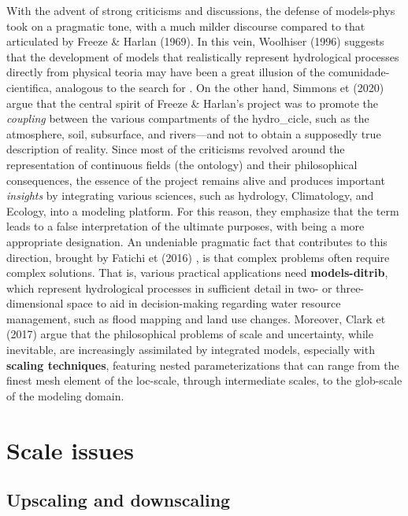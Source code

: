 \documentclass[./main_en.tex]{subfiles}
\begin{document}
\par With the advent of strong criticisms and discussions, the defense of \gls{models-phys} took on a pragmatic tone, with a much milder discourse compared to that articulated by Freeze \& Harlan (1969). In this vein, Woolhiser (1996) \cite{Woolhiser1996a} suggests that the development of models that realistically represent hydrological processes directly from physical \gls{teoria} may have been a great illusion of the \gls{comunidade-cientifica}, analogous to the search for . On the other hand, Simmons et  (2020) \cite{Simmons2020a} argue that the central spirit of Freeze \& Harlan's project was to promote the \textit{coupling} between the various compartments of the \gls{hydro_cicle}, such as the atmosphere, soil, subsurface, and rivers—and not to obtain a supposedly true description of reality. Since most of the criticisms revolved around the representation of continuous fields (the ontology) and their philosophical consequences, the essence of the project remains alive and produces important \textit{insights} by integrating various sciences, such as \gls{hydrology}, Climatology, and Ecology, into a modeling platform. For this reason, they emphasize that the term  leads to a false interpretation of the ultimate purposes, with  being a more appropriate designation. An undeniable pragmatic fact that contributes to this direction, brought by Fatichi et  (2016) \cite{Fatichi2016a}, is that complex problems often require complex solutions. That is, various practical applications need \textbf{\gls{models-ditrib}}, which represent hydrological processes in sufficient detail in two- or three-dimensional space to aid in decision-making regarding water resource management, such as flood mapping and land use changes. Moreover, Clark et  (2017) \cite{Clark2017a} argue that the philosophical problems of scale and uncertainty, while inevitable, are increasingly assimilated by integrated models, especially with \textbf{scaling techniques}, featuring nested parameterizations that can range from the finest mesh element of the \gls{loc-scale}, through intermediate scales, to the \gls{glob-scale} of the modeling domain.
 
\section{Scale issues} \label{sec:hydro:sim}

\subsection{Upscaling and downscaling}
\end{document}
